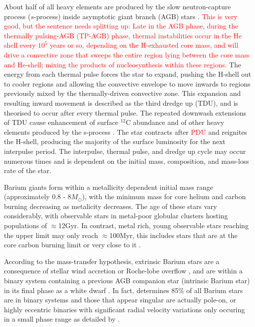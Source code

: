 \documentclass[a4paper,fleqn,usenatbib]{mnras}
\newcommand{\todo}[1]{\textcolor{red}{#1}}
\begin{document}
About half of all heavy elements are produced by the slow neutron-capture process ($s$-process) inside asymptotic giant branch (AGB) stars \citep[e.g.][]{busso1999,travaglio2001,
herwig2005,romano2010,kobayashi2011,prantzos2012,bisterzo2014,
karakas12016}. 
\todo{This is very good, but the sentence needs splitting up: Late in the AGB phase, during the thermally pulsing-AGB (TP-AGB) phase, thermal instabilities occur in the He shell every $10^5$ years or so, depending on the H-exhausted core mass, and will drive a convective zone that sweeps the entire region lying between the core mass and He-shell; mixing the products of nucleosynthesis within these regions.} The energy from each thermal pulse forces the star to expand, pushing the H-shell out to cooler regions and allowing the convective envelope to move inwards to regions previously mixed by the thermally-driven convective zone. This expansion and resulting inward movement is described as the third dredge up (TDU), and is theorised to occur after every thermal pulse. 
The repeated downwash extensions of TDU cause enhancement of surface $^{12}$C abundance and of other heavy elements produced by the s-process \citep[e.g.,][]{busso2001}. The star contracts after \todo{PDU} and reignites the H-shell, producing the majority of the surface luminosity for the next interpulse period. The interpulse, thermal pulse, and dredge up cycle may occur numerous times and is dependent on the initial mass, composition, and mass-loss rate of the star.


Barium giants form within a metallicity dependent initial mass range (approximately 0.8 - 8$M_{\odot}$), with the minimum mass for core helium and carbon burning decreasing as metalicity decreases. The age of these stars vary considerably, with observable stars in metal-poor globular clusters hosting populations of $\approx$12Gyr. In contrast, metal rich, young observable stars reaching the upper limit may only reach $\approx$100Myr, this includes stars that are at the core carbon burning limit or very close to it \citep[e.g.][]{whitelock2013}.



According to the mass-transfer hypothesis, extrinsic Barium stars are a consequence of stellar wind accretion \citep{boffin1988,jorissen1992} or Roche-lobe overflow \citep{webbink1986}, and are within a binary system containing a previous AGB companion star (intrinsic Barium star) in its final phase as a white dwarf \citep{bohm1980,bohm1984}. In fact, \citet{mcclure1983} determines 85\% of all Barium stars are in binary systems and those that appear singular are actually pole-on, or highly eccentric binaries with significant radial velocity variations only occuring in a small phase range as detailed by \citet{pourbaix2004}.
\end{document}

